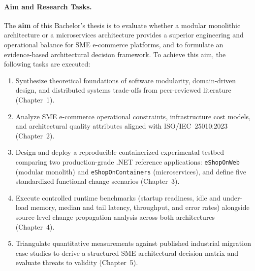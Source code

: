 \paragraph{Aim and Research Tasks.}
The \textbf{aim} of this Bachelor's thesis is to evaluate whether a modular monolithic architecture or a microservices architecture provides a superior engineering and operational balance for SME e-commerce platforms, and to formulate an evidence-based architectural decision framework. To achieve this aim, the following tasks are executed:
\begin{enumerate}[leftmargin=1.5em]
  \item Synthesize theoretical foundations of software modularity, domain-driven design, and distributed systems trade-offs from peer-reviewed literature (Chapter~1).
  \item Analyze SME e-commerce operational constraints, infrastructure cost models, and architectural quality attributes aligned with ISO/IEC~25010:2023 (Chapter~2).
  \item Design and deploy a reproducible containerized experimental testbed comparing two production-grade .NET reference applications: \texttt{eShopOnWeb} (modular monolith) and \texttt{eShopOnContainers} (microservices), and define five standardized functional change scenarios (Chapter~3).
  \item Execute controlled runtime benchmarks (startup readiness, idle and under-load memory, median and tail latency, throughput, and error rates) alongside source-level change propagation analysis across both architectures (Chapter~4).
  \item Triangulate quantitative measurements against published industrial migration case studies to derive a structured SME architectural decision matrix and evaluate threats to validity (Chapter~5).
\end{enumerate}

